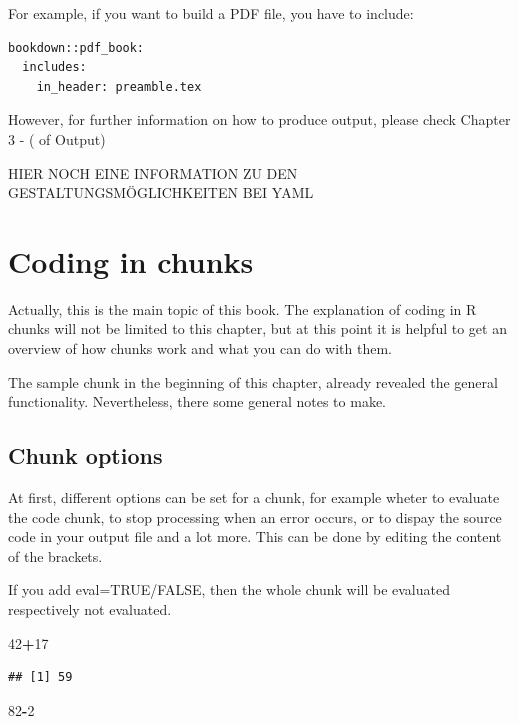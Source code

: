 \documentclass[]{report}
\newenvironment{Shaded}{\begin{snugshade}}{\end{snugshade}}
\newcommand{\DecValTok}[1]{\textcolor[rgb]{0.00,0.00,0.81}{#1}}
\newcommand{\OperatorTok}[1]{\textcolor[rgb]{0.81,0.36,0.00}{\textbf{#1}}}
\begin{document}
For example, if you want to build a PDF file, you have to include:

\begin{verbatim}
bookdown::pdf_book:
  includes:
    in_header: preamble.tex
\end{verbatim}

However, for further information on how to produce output, please check
Chapter 3 - (\citet{ref/Creation} of Output)

HIER NOCH EINE INFORMATION ZU DEN GESTALTUNGSMÖGLICHKEITEN BEI YAML

\section{Coding in chunks}\label{coding-in-chunks}

Actually, this is the main topic of this book. The explanation of coding
in R chunks will not be limited to this chapter, but at this point it is
helpful to get an overview of how chunks work and what you can do with
them.

The sample chunk in the beginning of this chapter, already revealed the
general functionality. Nevertheless, there some general notes to make.

\subsection{Chunk options}\label{chunk-options}

At first, different options can be set for a chunk, for example wheter
to evaluate the code chunk, to stop processing when an error occurs, or
to dispay the source code in your output file and a lot more. This can
be done by editing the content of the brackets.

If you add eval=TRUE/FALSE, then the whole chunk will be evaluated
respectively not evaluated.

\begin{Shaded}
\begin{Highlighting}[]
\DecValTok{42}\OperatorTok{+}\DecValTok{17}
\end{Highlighting}
\end{Shaded}

\begin{verbatim}
## [1] 59
\end{verbatim}

\begin{Shaded}
\begin{Highlighting}[]
\DecValTok{82}\OperatorTok{-}\DecValTok{2}
\end{Highlighting}
\end{Shaded}
\end{document}
